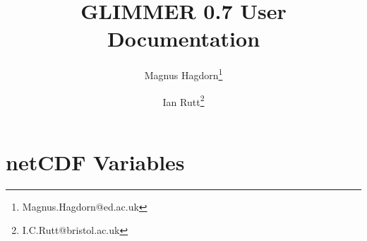 \newcommand{\dir}{ug}

\pagestyle{myheadings}


\title{GLIMMER 0.7 User Documentation}
\author{Magnus Hagdorn\thanks{Magnus.Hagdorn@ed.ac.uk} \and Ian Rutt\thanks{I.C.Rutt@bristol.ac.uk}}
\maketitle
\tableofcontents
\newpage


\appendix
\section{netCDF Variables}


